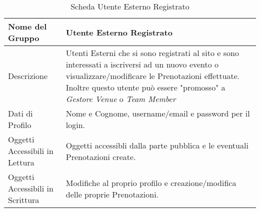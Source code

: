 \begin{table}[H]
    \begin{center}  
        \begin{tabular}{ | l | p{10cm} |} %
        \hline
        \textbf{Nome del Gruppo} & \textbf{Utente Esterno Registrato}\\ \hline  
           
        Descrizione & Utenti Esterni che si sono registrati al sito e sono interessati a iscriversi ad un nuovo evento o visualizzare/modificare le Prenotazioni effettuate. Inoltre questo utente può essere "promosso" a \textit{Gestore Venue} o \textit{Team Member}\\ \hline  
           
        Dati di Profilo & Nome e Cognome, username/email e password per il login.\\ \hline  
           
        Oggetti Accessibili in Lettura & Oggetti accessibli dalla parte pubblica e le eventuali Prenotazioni create.\\ \hline  
           
        Oggetti Accessibili in Scrittura & Modifiche al proprio profilo e creazione/modifica delle proprie Prenotazioni.\\ \hline  
           
        \end{tabular}  
        \caption{Scheda Utente Esterno Registrato}
    \end{center}  
\end{table}